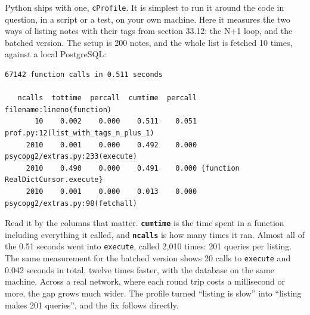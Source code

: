 Python ships with one, \texttt{cProfile}. It is simplest to run it around the code in question, in a script or a test, on your own machine. Here it measures the two ways of listing notes with their tags from section 33.12: the N+1 loop, and the batched version. The setup is 200 notes, and the whole list is fetched 10 times, against a local PostgreSQL:

\begin{codebox}[short]

\begin{Shaded}
\begin{Highlighting}[]

    \NormalTok{ \_ } \NormalTok{(}\NormalTok{):}

\NormalTok{)}
\end{Highlighting}
\end{Shaded}

\end{codebox}

\begin{outputbox}[short]
\begin{Verbatim}[fontsize=\codesize, breaklines, breakanywhere, breaksymbolleft={\tiny\textcolor{muted}{$\hookrightarrow$}}]
         67142 function calls in 0.511 seconds

   ncalls  tottime  percall  cumtime  percall filename:lineno(function)
       10    0.002    0.000    0.511    0.051 prof.py:12(list_with_tags_n_plus_1)
     2010    0.001    0.000    0.492    0.000 psycopg2/extras.py:233(execute)
     2010    0.490    0.000    0.491    0.000 {function RealDictCursor.execute}
     2010    0.001    0.000    0.013    0.000 psycopg2/extras.py:98(fetchall)
\end{Verbatim}
\end{outputbox}

\noindent{}Read it by the columns that matter. \textbf{\texttt{cumtime}} is the time spent in a function including everything it called, and \textbf{\texttt{ncalls}} is how many times it ran. Almost all of the 0.51 seconds went into \texttt{execute}, called 2,010 times: 201 queries per listing. The same measurement for the batched version shows 20 calls to \texttt{execute} and 0.042 seconds in total, twelve times faster, with the database on the same machine. Across a real network, where each round trip costs a millisecond or more, the gap grows much wider. The profile turned ``listing is slow'' into ``listing makes 201 queries'', and the fix follows directly.

